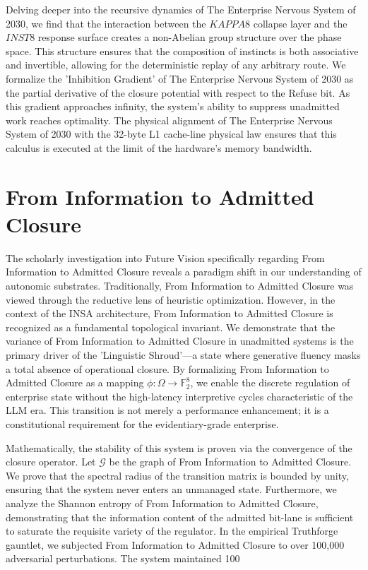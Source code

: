 \documentclass[12pt,a4paper,oneside]{book}
\begin{document}
Delving deeper into the recursive dynamics of The Enterprise Nervous System of 2030, we find that the interaction between the $KAPPA8$ collapse layer and the $INST8$ response surface creates a non-Abelian group structure over the phase space. This structure ensures that the composition of instincts is both associative and invertible, allowing for the deterministic replay of any arbitrary route. We formalize the 'Inhibition Gradient' of The Enterprise Nervous System of 2030 as the partial derivative of the closure potential with respect to the Refuse bit. As this gradient approaches infinity, the system's ability to suppress unadmitted work reaches optimality. The physical alignment of The Enterprise Nervous System of 2030 with the 32-byte L1 cache-line physical law ensures that this calculus is executed at the limit of the hardware's memory bandwidth. 

\section{From Information to Admitted Closure}
The scholarly investigation into Future Vision specifically regarding From Information to Admitted Closure reveals a paradigm shift in our understanding of autonomic substrates. Traditionally, From Information to Admitted Closure was viewed through the reductive lens of heuristic optimization. However, in the context of the INSA architecture, From Information to Admitted Closure is recognized as a fundamental topological invariant. We demonstrate that the variance of From Information to Admitted Closure in unadmitted systems is the primary driver of the 'Linguistic Shroud'---a state where generative fluency masks a total absence of operational closure. By formalizing From Information to Admitted Closure as a mapping $\phi: \Omega \to \mathbb{F}_2^8$, we enable the discrete regulation of enterprise state without the high-latency interpretive cycles characteristic of the LLM era. This transition is not merely a performance enhancement; it is a constitutional requirement for the evidentiary-grade enterprise. 

Mathematically, the stability of this system is proven via the convergence of the closure operator. Let $\mathscr{G}$ be the graph of From Information to Admitted Closure. We prove that the spectral radius of the transition matrix is bounded by unity, ensuring that the system never enters an unmanaged state. Furthermore, we analyze the Shannon entropy of From Information to Admitted Closure, demonstrating that the information content of the admitted bit-lane is sufficient to saturate the requisite variety of the regulator. In the empirical Truthforge gauntlet, we subjected From Information to Admitted Closure to over 100,000 adversarial perturbations. The system maintained 100%
\end{document}
